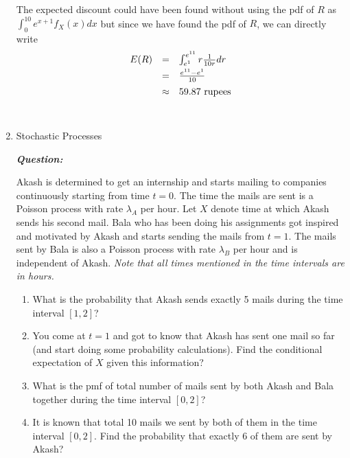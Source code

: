 \documentclass[12pt, oneside]{article}
\begin{document}
\begin{enumerate}
The expected discount could have been found without using the pdf of $R$ as $\int_0^{10} e^{x+1}f_X(x)dx$ but since we have found the pdf of $R$, we can directly write
        \[\def\arraystretch{1.4}
            \begin{array}{lcl}
                E(R) & = & \int_{e^1}^{e^{11}} r \frac{1}{10r} dr \\
                ~ & = & \frac{e^{11} - e^1}{10} \\
                ~ & \approx & 59.87 \text{ rupees}
            \end{array}
        \]\\


\newpage

\item Stochastic Processes

\textbf{\textit{Question:}}

Akash is determined to get an internship and starts mailing to companies continuously starting from time $t=0$. The time the mails are sent is a Poisson process with rate $\lambda_A$ per hour. Let $X$ denote time at which Akash sends his second mail. Bala who has been doing his assignments got inspired and motivated by Akash and starts sending the mails from $t=1$. The mails sent by Bala is also a Poisson process with rate $\lambda_B$ per hour and is independent of Akash. \textit{Note that all times mentioned in the time intervals are in hours.}

\begin{enumerate}[label=(\alph*)]

\item What is the probability that Akash sends exactly 5 mails during the time interval $[1,2]$?
\item You come at $t=1$ and got to know that Akash has sent one mail so far (and start doing some probability calculations). Find the conditional expectation of $X$ given this information?
\item What is the pmf of total number of mails sent by both Akash and Bala together during the time interval $[0,2]$?
\item It is known that total 10 mails we sent by both of them in the time interval $[0,2]$. Find the probability that exactly 6 of them are sent by Akash? 

\end{enumerate}


\end{enumerate}
\end{document}
